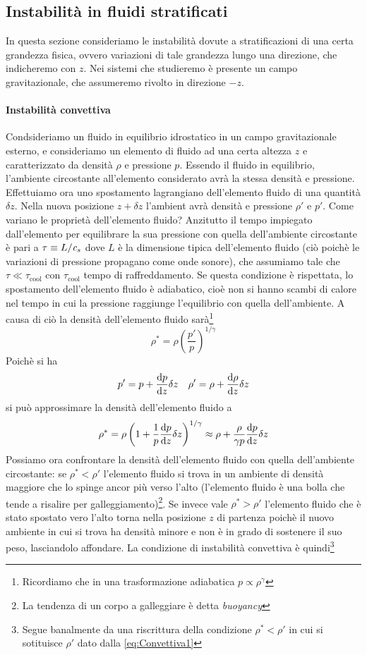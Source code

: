 \subsection{Instabilità in fluidi stratificati}
In questa sezione consideriamo le instabilità dovute a stratificazioni di una certa grandezza fisica, ovvero variazioni di tale grandezza lungo una direzione, che indicheremo con $z$. Nei sistemi che studieremo è presente un campo gravitazionale, che assumeremo rivolto in direzione $-z$.
\paragraph{Instabilità convettiva}
Condsideriamo un fluido in equilibrio idrostatico in un campo gravitazionale esterno, e consideriamo un elemento di fluido ad una certa altezza $z$ e caratterizzato da densità $\rho$ e pressione $p$. Essendo il fluido in equilibrio, l'ambiente circostante all'elemento considerato avrà la stessa densità e pressione. Effettuiamo ora uno spostamento lagrangiano dell'elemento fluido di una quantità $\delta z$. Nella nuova posizione $z+\delta z$ l'ambient avrà densità e pressione $\rho'$ e $p'$. Come variano le proprietà dell'elemento fluido? Anzitutto il tempo impiegato dall'elemento per equilibrare la sua pressione con quella dell'ambiente circostante è pari a $\tau \equiv L/\textit{c}_{s}$ dove $L$ è la dimensione tipica dell'elemento fluido (ciò poichè le variazioni di pressione propagano come onde sonore), che assumiamo tale che $\tau \ll \tau_\mathrm{cool}$ con $\tau_\mathrm{cool}$ tempo di raffreddamento. Se questa condizione è rispettata, lo spostamento dell'elemento fluido è adiabatico, cioè non si hanno scambi di calore nel tempo in cui la pressione raggiunge l'equilibrio con quella dell'ambiente. A causa di ciò la densità dell'elemento fluido sarà\footnote{Ricordiamo che in una trasformazione adiabatica $p\propto\rho^\gamma$}
\begin{equation}
\rho^{*} = \rho \left(\dfrac{p'}{p}\right)^{1/\gamma}
\end{equation}
Poichè si ha
\begin{align}
&p'=p+\dfrac{\mathrm{d} {p}}{\mathrm{d} {z}} \delta z \label{eq:Convettiva1}
&\rho'=\rho+\dfrac{\mathrm{d} {\rho}}{\mathrm{d} {z}} \delta z
\end{align}
si può approssimare la densità dell'elemento fluido a 
\begin{equation}
\rho^{*}=\rho\left(1+\dfrac{1}{p}\dfrac{\mathrm{d} {p}}{\mathrm{d} {z}}\delta z\right)^{1/\gamma} \approx \rho + \dfrac{\rho}{\gamma p}\dfrac{\mathrm{d} {p}}{\mathrm{d} {z}}\delta z
\end{equation}
Possiamo ora confrontare la densità dell'elemento fluido con quella dell'ambiente circostante: se $\rho^*<\rho'$ l'elemento fluido si trova in un ambiente di densità maggiore che lo spinge ancor più verso l'alto (l'elemento fluido è una bolla che tende a risalire per galleggiamento)\footnote{La tendenza di un corpo a galleggiare è detta \textit{buoyancy}}. Se invece vale $\rho^*>\rho'$ l'elemento fluido che è stato spostato vero l'alto torna nella posizione $z$ di partenza poichè il nuovo ambiente in cui si trova ha densità minore e non è in grado di sostenere il suo peso, lasciandolo affondare. La condizione di instabilità convettiva è quindi\footnote{Segue banalmente da una riscrittura della condizione $\rho^*<\rho'$ in cui si sotituisce $\rho'$ dato dalla \ref{eq:Convettiva1} }
